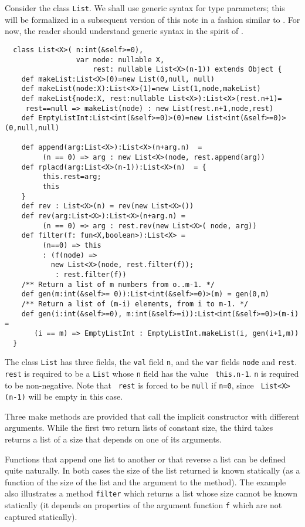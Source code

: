 \documentclass{article}
\begin{document}
\begin{example}[List]\label{List}
Consider the class {\tt List}. We shall use generic syntax for
type parameters; this will be formalized in a subsequent version 
of this note in a fashion similar to \cite{FJ}. For now, 
the reader should understand generic syntax in the spirit of \cite{FJ}.

{\footnotesize
\begin{verbatim}
  class List<X>( n:int(&self>=0), 
                 var node: nullable X, 
                     rest: nullable List<X>(n-1)) extends Object {
    def makeList:List<X>(0)=new List(0,null, null)
    def makeList(node:X):List<X>(1)=new List(1,node,makeList)
    def makeList{node:X, rest:nullable List<X>):List<X>(rest.n+1)=
     rest==null => makeList(node) : new List(rest.n+1,node,rest)
    def EmptyListInt:List<int(&self>=0)>(0)=new List<int(&self>=0)>(0,null,null)

    def append(arg:List<X>):List<X>(n+arg.n)  =
         (n == 0) => arg : new List<X>(node, rest.append(arg))
    def rplacd(arg:List<X>(n-1)):List<X>(n)  = {
         this.rest=arg;
         this
    }
    def rev : List<X>(n) = rev(new List<X>())
    def rev(arg:List<X>):List<X>(n+arg.n) = 
         (n == 0) => arg : rest.rev(new List<X>( node, arg))
    def filter(f: fun<X,boolean>):List<X> = 
         (n==0) => this
         : (f(node) => 
           new List<X>(node, rest.filter(f));
            : rest.filter(f))
    /** Return a list of m numbers from o..m-1. */
    def gen(m:int(&self>= 0)):List<int(&self>=0)>(m) = gen(0,m)
    /** Return a list of (m-i) elements, from i to m-1. */
    def gen(i:int(&self>=0), m:int(&self>=i)):List<int(&self>=0)>(m-i) = 
       (i == m) => EmptyListInt : EmptyListInt.makeList(i, gen(i+1,m))
  }  
\end{verbatim}}

The class {\tt List} has three fields, the {\tt val} field {\tt n},
and the {\tt var} fields {\tt node} and {\tt rest}. {\tt rest} is
required to be a {\tt List} whose {\tt n} field has the value {\tt
this.n-1}.  {\tt n} is required to be non-negative. Note that {\tt
rest} is forced to be {\tt null} if {\tt n=0}, since {\tt
List<X>(n-1)} will be empty in this case.

Three make methods are provided that call the implicit constructor
with different arguments. While the first two return lists of
constant size, the third takes  returns a list of a size
that depends on one of its arguments. 

Functions that append one list to another or that reverse a list can
be defined quite naturally. In both cases the size of the
list returned is known statically (as a function of the size of the
list and the argument to the method).  The example also illustrates a
method {\tt filter} which returns a list whose size cannot be known
statically (it depends on properties of the argument function {\tt f}
which are not captured statically).


\end{example}
\end{document}
